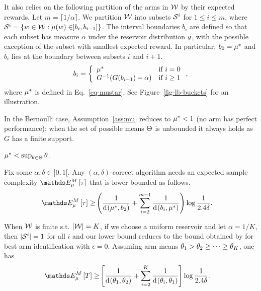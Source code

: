 It also relies on the following partition of the arms in $\mathcal{W}$ by their
expected rewards.
Let $m = \lceil 1/\alpha \rceil$. We partition $\mathcal{W}$ into subsets
$\mathcal{S}^{i}$ for $1 \le i \le m$,
where $\mathcal{S}^{i} = \{w \in \mathcal{W}:\mu(w) \in ]b_i,b_{i-1}]\}$.
The interval boundaries $b_i$ are defined so that each subset has measure
$\alpha$ under the reservoir distribution $g$,
with the possible exception of the subset with smallest expected reward.
In particular, $b_0 = \mu^*$ and $b_i$ lies at the boundary between subsets
$i$ and $i+1$.
\begin{align}
b_i = \left\{ \begin{array}{ll}
    \mu^* & \text{if $i = 0$} \\
    G^{-1}(G(b_{i-1}) - \alpha) & \text{if $i \ge 1$}
\end{array}\right.,
\end{align}
where $\mu^*$ is defined in Eq.~\ref{eq-mustar}.
See Figure~\ref{fig-lb-buckets} for an illustration.


In the
Bernoulli case,
Assumption~\ref{ass:mu} reduces to $\mu^* < 1$ (no arm has perfect performance);
when the set of possible
means $\Theta$ is unbounded it always holds as $G$ has a finite
support.

\begin{assumption}\label{ass:mu} $\mu^* < \sup_{\theta \in \Theta} \theta$. 
 \end{assumption}


\begin{theorem}\label{thm-lb}
Fix some $\alpha, \delta \in ]0,1[$. Any $(\alpha,\delta)$-correct algorithm
needs an expected sample
complexity $\ETrueModel{\tau}$ that is lower bounded as follows.
\begin{align*}
\ETrueModel{\tau} \ge & \left(
    \frac{1}{\ArmKL{\ArmMean^*}{b_2}}
  + \sum_{i=2}^{m-1} \frac{1}{
            \ArmKL{b_i}{\ArmMean^*}
     }
\right)
\log \frac{1}{2.4\delta}.
\end{align*}
\end{theorem}

\begin{remark}\label{rem-finite-lb}
When $\mathcal{W}$ is finite s.t. $|\mathcal{W}|=K$, if we choose a uniform
reservoir and let
$\alpha = 1/K$, then $|\mathcal{S}^{i}| = 1$ for all $i$ and our lower bound
reduces to the bound obtained by \cite{JMLR15}
for best arm identification with $\epsilon=0$. Assuming arm means $\theta_1 > \theta_2 \geq \dots
\geq \theta_K $, one has
\begin{align*}
\ETrueModel{T} \ge &\left[ \frac{1}{\ArmKL{\expReward_1}{\expReward_2}} +
\sum_{i=2}^K\frac{1}{\ArmKL{\expReward_i}{\expReward_1}}\right] \log
\frac{1}{2.4\delta}.
\end{align*}
\end{remark}






